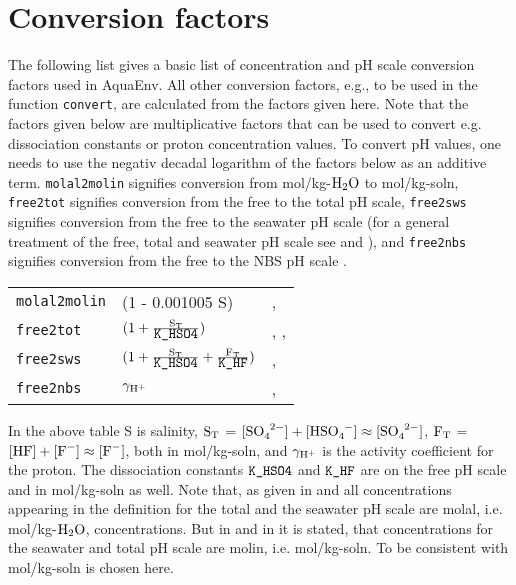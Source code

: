 \documentclass[a4paper]{article}
\begin{document}
\section{Conversion factors}
The following list gives a basic list of concentration and pH scale conversion factors used in \textsf{AquaEnv}. All other conversion factors, e.g., to be used in the function \texttt{convert}, are calculated from the factors given here. Note that the factors given below are multiplicative factors that can be used to convert e.g. dissociation constants or proton concentration values. To convert pH values, one needs to use the negativ decadal logarithm of the factors below as an additive term. \texttt{molal2molin} signifies conversion from mol/kg-$\rm H_2O$ to mol/kg-soln, \texttt{free2tot} signifies conversion from the free to the total pH scale, \texttt{free2sws}  signifies conversion from the free to the seawater pH scale (for a general treatment of the free, total and seawater pH scale see \citet{Dickson1984} and \citet{Zeebe2001}), and \texttt{free2nbs} signifies conversion from the free to the NBS pH scale \citep{Durst1975}.
\begin{center}
\begin{tabular}{|llp{}|} \hline
\texttt{molal2molin} & (1 - 0.001005 S) & \citet[p. 257]{Roy1993a}, \citet[chap. 5, p. 15]{DOE1994}\\
\texttt{free2tot} & $\rm (1 + \frac{S_T}{\mbox{\texttt{K\_HSO4}}})$ &\citet[p. 2302]{Dickson1984}, \citet[chap. 5, p. 16]{DOE1994}, \citet[p. 57, p. 261]{Zeebe2001}\\
\texttt{free2sws} &  $\rm (1 + \frac{S_T}{\mbox{\texttt{K\_HSO4}}} + \frac{F_T}{\mbox{\texttt{K\_HF}}})$ & \citet[p. 2303]{Dickson1984}, \citet{Zeebe2001}\\ 
\texttt{free2nbs} &  $\rm \gamma_{\rm H^+}$ & \citet{Dickson1984}, \citet{Zeebe2001}\\ \hline
\end{tabular}
\end{center}
In the above table S is salinity, $\rm S_T$ = $[\ce{SO_4^{2-}}] + [\ce{HSO_4^-}] \approx [\ce{SO_4^{2-}}]$, $\rm F_T$ = $\rm [\ce{HF}] + [\ce{F^-}] \approx [\ce{F^-}]$, both in mol/kg-soln, and $\rm \gamma_{\rm H^+}$ is the activity coefficient for the proton. The dissociation constants $\mbox{\texttt{K\_HSO4}}$ and $\mbox{\texttt{K\_HF}}$ are on the free pH scale and in mol/kg-soln as well. Note that, as given in \citet[p. 2303]{Dickson1984} and \citet[p. 91f]{Dickson1979} all concentrations appearing in the definition for the total and the seawater pH scale are molal, i.e.  mol/kg-$\rm H_2O$, concentrations. But in \citet[p. 257]{Roy1993a} and in \citet[chap.. 4, SOP 6, p. 1]{DOE1994} it is stated, that concentrations for the seawater and total pH scale are molin, i.e. mol/kg-soln. To be consistent with \citet{DOE1994} mol/kg-soln is chosen here.
\end{document}
